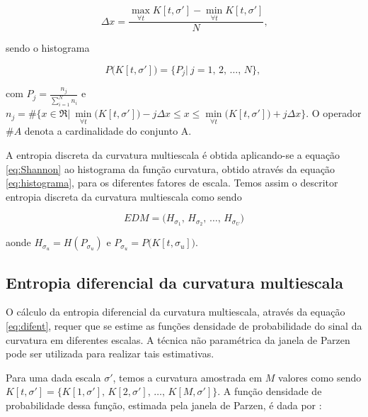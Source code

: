 \begin{equation}
\Delta x = \frac{\max\limits_{\forall t}{K[t,\sigma']}-\min\limits_{\forall t}{K[t,\sigma']}}{N}\text{,}
\end{equation}

 sendo o histograma

\begin{equation}\label{eq:histograma}
P\big(K[t,\sigma']\big) = \Big\{P_j|\:j = 1\text{, }2\text{, }\ldots\text{, }N\Big\}\text{, }
\end{equation}


 com $P_j=\frac{n_j}{\sum\limits_{i=1}^Nn_i}$ e $n_j = \#\{x \in \Re|\:\min\limits_{\forall t}{\big(K[t,\sigma']\big)}- j\Delta x \leq x \leq \min\limits_{\forall t}{\big(K[t,\sigma']\big)}+j\Delta x\}$. O operador $\#A$ denota a cardinalidade do conjunto A. 
 
 A entropia discreta da curvatura multiescala é obtida aplicando-se a equação \ref{eq:Shannon} ao histograma da função curvatura, obtido através da equação \ref{eq:histograma}, para os diferentes fatores de escala. Temos assim o descritor entropia discreta da curvatura multiescala como sendo
 
\begin{equation}
EDM = \big(H_{\sigma_1}\text{, } H_{\sigma_2}\text{, }\ldots\text{, }H_{\sigma_U}\big)
\end{equation}

aonde $H_{\sigma_u} = H(P_{\sigma_u})$ e $P_{\sigma_u} = P\big(K[t,\sigma_u]\big)$.
 
\subsection{Entropia diferencial da curvatura multiescala}

O cálculo da entropia diferencial da curvatura multiescala, através da equação \ref{eq:difent}, requer que se estime as funções densidade de probabilidade do sinal da curvatura em diferentes escalas.  A técnica não paramétrica da janela de Parzen pode ser utilizada para realizar tais estimativas. 
 
 Para uma dada escala $\sigma'$, temos a curvatura amostrada em $M$ valores como sendo $K[t,\sigma'] = \{K[1,\sigma']\text{, }K[2,\sigma']\text{, }\ldots\text{, }K[M,\sigma']\}$. A função densidade de probabilidade dessa função, estimada pela janela de Parzen, é dada por \cite{Webb:2002}:  
 

